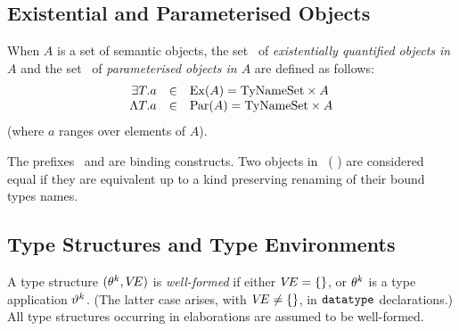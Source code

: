 
\subsection{Existential and Parameterised Objects}

When $A$ is a set of semantic objects,
 the set \ of
\emph{existentially quantified objects in $A$} and the set
\ of \emph{parameterised objects in $A$} 
are defined as follows:
\begin{displaymath}
\begin{array}{rcl}
   \EXISTS{\T}{a} & \in  & \EXISTENTIAL{A} = \TyNameSets \times  A \\
   \LAMBDA{\T}{a} & \in  & \PARAMETERISED{A}  = \TyNameSets \times A 
\end{array}
\end{displaymath}
(where $a$ ranges over elements of $A$).

The prefixes \EXISTS{\T}{\_}\ and \LAMBDA{\T}{\_} are binding constructs.
Two objects in \ ( ) are considered equal
if they are equivalent up to a 
kind 
preserving renaming of their bound types names.

\subsection{Type Structures and Type Environments}
\label{typeenv-wf-sec}


A type structure $(\typefnc[\k],\VE)$ is {\sl well-formed} if either
$\VE=\emptymap$, or $\typefnc[\k]$ is a type application $\typeapp[\k]$.
(The latter case arises, with $\VE\neq\emptymap$, in $\DATATYPE$
declarations.)
All type structures occurring in elaborations are assumed to
be well-formed.

